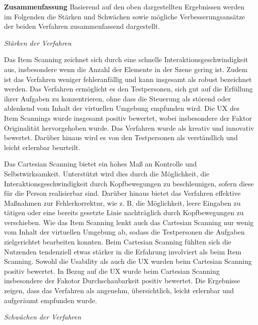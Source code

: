 \textbf{Zusammenfassung}
Basierend auf den oben dargestellten Ergebnissen werden im Folgenden die Stärken und Schwächen sowie mögliche Verbesserungsansätze der beiden Verfahren zusammenfassend dargestellt.

\textit{Stärken der Verfahren}

Das Item Scanning zeichnet sich durch eine schnelle Interaktionsgeschwindigkeit aus, insbesondere wenn die Anzahl der Elemente in der Szene gering ist. Zudem ist das Verfahren weniger fehleranfällig und kann insgesamt als robust bezeichnet werden. Das Verfahren ermöglicht es den Testpersonen, sich gut auf die Erfüllung ihrer Aufgaben zu konzentrieren, ohne dass die Steuerung als störend oder ablenkend vom Inhalt der virtuellen Umgebung empfunden wird. Die UX des Item Scannings wurde insgesamt positiv bewertet, wobei insbesondere der Faktor Originalität hervorgehoben wurde. Das Verfahren wurde als kreativ und innovativ bewertet. Darüber hinaus wird es von den Testpersonen als verständlich und leicht erlernbar beurteilt. 

Das Cartesian Scanning bietet ein hohes Maß an Kontrolle und Selbstwirksamkeit. Unterstützt wird dies durch die Möglichkeit, die Interaktionsgeschwindigkeit durch Kopfbewegungen zu beschleunigen, sofern diese für die Person realisierbar sind. Darüber hinaus bietet das Verfahren effektive Maßnahmen zur Fehlerkorrektur, wie z. B.  die Möglichkeit, leere Eingaben zu tätigen oder eine bereits gesetzte Linie nachträglich durch Kopfbewegungen zu verschieben.
Wie das Item Scanning lenkt auch das Cartesian Scanning nur wenig vom Inhalt der virtuellen Umgebung ab, sodass die Testpersonen die Aufgaben zielgerichtet bearbeiten konnten. Beim Cartesian Scanning fühlten sich die Nutzenden tendenziell etwas stärker in die Erfahrung involviert als beim Item Scanning.
Sowohl die Usability als auch die UX wurden beim Cartesian Scanning positiv bewertet. In Bezug auf die UX wurde beim Cartesian Scanning insbesondere der Fakotor Durchschaubarkeit positiv bewertet. Die Ergebnisse zeigen, dass das Verfahren als angenehm, übersichtlich, leicht erlernbar und aufgeräumt empfunden wurde.

\textit{Schwächen der Verfahren}

